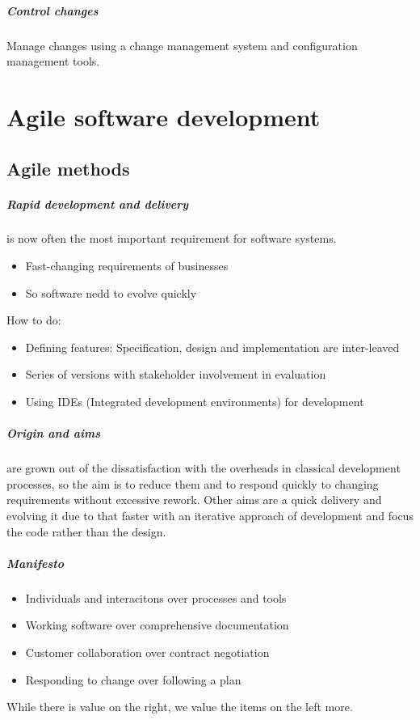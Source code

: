 \documentclass[a4paper,11pt,twocolumn]{report}
\begin{document}
    \paragraph{Control changes} Manage changes using a change management system
    and configuration management tools.


    \chapter{Agile software development}
    \section{Agile methods}
    \paragraph{Rapid development and delivery} is now often the most important
    requirement for software systems.
    \begin{itemize}
        \item Fast-changing requirements of businesses
        \item So software nedd to evolve quickly
    \end{itemize}
    How to do:
    \begin{itemize}
        \item Defining features: Specification, design and implementation are
            inter-leaved
        \item Series of versions with stakeholder involvement in evaluation
        \item Using IDEs (Integrated development environments) for development
    \end{itemize}
    \paragraph{Origin and aims} are grown out of the dissatisfaction with the
    overheads in classical development processes, so the aim is to reduce them
    and to respond quickly to changing requirements without excessive rework.
    Other aims are a quick delivery and evolving it due to that faster with an
    iterative approach of development and focus the code rather than the
    design.
    \paragraph{Manifesto}
    \begin{itemize}
        \item Individuals and interacitons over processes and tools
        \item Working software over comprehensive documentation
        \item Customer collaboration over contract negotiation
        \item Responding to change over following a plan
    \end{itemize}
    While there is value on the right, we value the items on the left more.
\end{document}

